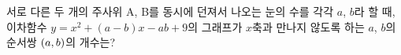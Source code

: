 서로 다른 두 개의 주사위 A, B를 동시에 던져서 나오는 눈의 수를 각각 $a$, $b$라 할 때, 이차함수 $y=x^2+(a-b)x-ab+9$의 그래프가 $x$축과 만나지 않도록 하는 $a$, $b$의 순서쌍 $(a{,}\mkern3mu\mathopen{}b)$의 개수는?
